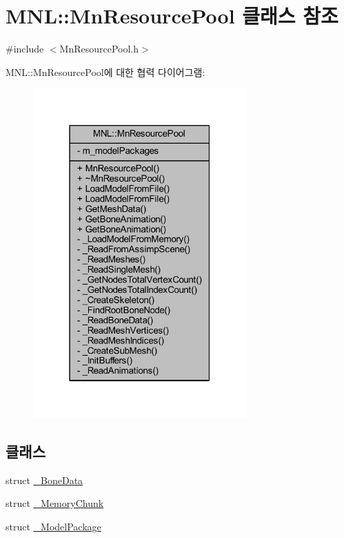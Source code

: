 \hypertarget{class_m_n_l_1_1_mn_resource_pool}{}\section{M\+NL\+:\+:Mn\+Resource\+Pool 클래스 참조}
\label{class_m_n_l_1_1_mn_resource_pool}


{\ttfamily \#include $<$Mn\+Resource\+Pool.\+h$>$}



M\+NL\+:\+:Mn\+Resource\+Pool에 대한 협력 다이어그램\+:\nopagebreak
\begin{figure}[H]
\begin{center}
\leavevmode
\includegraphics[width=232pt]{class_m_n_l_1_1_mn_resource_pool__coll__graph}
\end{center}
\end{figure}
\subsection*{클래스}
\begin{DoxyCompactItemize}
\item 
struct \hyperlink{struct_m_n_l_1_1_mn_resource_pool_1_1___bone_data}{\+\_\+\+Bone\+Data}
\item 
struct \hyperlink{struct_m_n_l_1_1_mn_resource_pool_1_1___memory_chunk}{\+\_\+\+Memory\+Chunk}
\item 
struct \hyperlink{struct_m_n_l_1_1_mn_resource_pool_1_1___model_package}{\+\_\+\+Model\+Package}
\end{DoxyCompactItemize}
